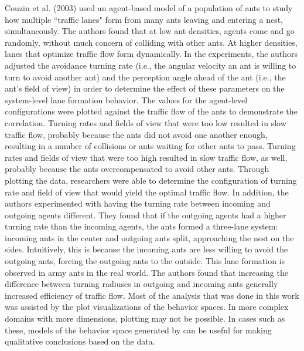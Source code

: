 Couzin et al. (2003)\nocite{couzin2003sol} used an agent-based model of a population of ants to study how multiple ``traffic lanes" form  from many ants leaving and entering a nest, simultaneously.
The authors found that at low ant densities, agents come and go randomly, without much concern of colliding with other ants.
At higher densities, lanes that optimize traffic flow form dynamically.
In the experiments, the authors adjusted the avoidance turning rate (i.e., the angular velocity an ant is willing to turn to avoid another ant) and the perception angle ahead of the ant (i.e., the ant's field of view) in order to determine the effect of these parameters on the system-level lane formation behavior.
The values for the agent-level configurations were plotted against the traffic flow of the ants to demonstrate the correlation.
Turning rates and fields of view that were too low resulted in slow traffic flow, probably because the ants did not avoid one another enough, resulting in a number of collisions or ants waiting for other ants to pass.
Turning rates and fields of view that were too high resulted in slow traffic flow, as well, probably because the ants overcompensated to avoid other ants.
Through plotting the data, researchers were able to determine the configuration of turning rate and field of view that would yield the optimal traffic flow.
In addition, the authors experimented with having the turning rate between incoming and outgoing agents different.
They found that if the outgoing agents had a higher turning rate than the incoming agents, the ants formed a three-lane system: incoming ants in the center and outgoing ants split, approaching the nest on the sides.
Intuitively, this is because the incoming ants are less willing to avoid the outgoing ants, forcing the outgoing ants to the outside.
This lane formation is observed in army ants in the real world.
The authors found that increasing the difference between turning radiuses in outgoing and incoming ants generally increased efficiency of traffic flow.
Most of the analysis that was done in this work was assisted by the plot visualizations of the behavior spaces.
In more complex domains with more dimensions, plotting may not be possible.
In cases such as these, models of the behavior space generated by \fw can be useful for making qualitative conclusions based on the data.

